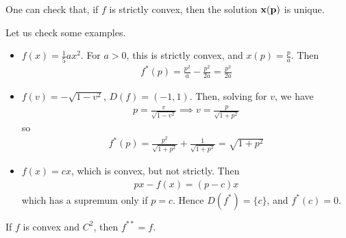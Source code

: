 \documentclass{../template/note}
\begin{document}
    \begin{remark*}
        One can check that, if $f$ is strictly convex, then the solution $\V x(\V p)$ is unique.
    \end{remark*}
    
    \begin{example*}
        Let us check some examples.
        \begin{itemize}
            \item $f(x) = \frac 1 5 ax^2$. For $a > 0$, this is strictly convex, and $x(p) = \frac p a$. Then
            \begin{align*}
                f^*(p) = \frac{p^2}{a} - \frac{p^2}{2a} = \frac{p^2}{2a}
            \end{align*}
            \item $f(v) = -\sqrt{1-v^2}$, $D(f) = (-1, 1)$. Then, solving for $v$, we have
            \begin{align*}
                p = \frac{v}{\sqrt{1-v^2}} \implies v = \frac{p}{\sqrt{1+p^2}}
            \end{align*}
            so
            \begin{align*}
                f^*(p) = \frac{p^2}{\sqrt{1+p^2}} + \frac{1}{\sqrt{1+p^2}} = \sqrt{1+p^2}
            \end{align*}
            \item $f(x) = cx$, which is convex, but not strictly. Then
            \begin{align*}
                px - f(x) = (p-c)x
            \end{align*}
            which has a supremum only if $p=c$. Hence $D(f^*) = \{c\}$, and $f^*(c) = 0$.
        \end{itemize}
    \end{example*}
    
    \begin{theorem}
        If $f$ is convex and $C^2$, then $f^{**} = f$.
    \end{theorem}
    
\end{document}
